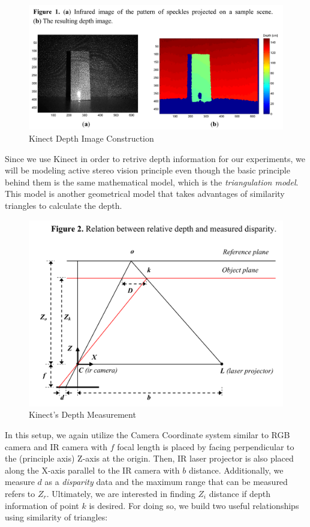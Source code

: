 \documentclass[a4paper]{report}
\numberwithin{figure}{section}
\begin{document}
\begin{figure}[H]
	\centering
  \includegraphics[width=0.7\linewidth,natwidth=640,natheight=640]
  {fig/ref_imgs/kinect_depth_img.png}
  \caption{Kinect Depth Image Construction}
	\label{fig:kinect_depth_img}
\end{figure}

Since we use Kinect in order to retrive depth information for our experiments, 
we will be modeling active stereo vision principle even though the 
basic principle behind them is the same mathematical model, which is 
the \textit{triangulation model}. This model is another geometrical model that 
takes advantages of similarity triangles to calculate the depth. 

\begin{figure}[H]
	\centering
  \includegraphics[width=0.7\linewidth,natwidth=640,natheight=640]
  {fig/ref_imgs/kinect_depth_measurement.png}
  \caption{Kinect's Depth Measurement}
	\label{fig:uncertainty_matching}
\end{figure}

In this setup, 
we again utilize the Camera Coordinate system similar to RGB camera
and IR camera with $f$ focal length is placed by facing perpendicular to 
the (principle axis) Z-axis at the origin. Then, IR laser projector is 
also placed along the X-axis parallel to the IR camera with $b$ distance. 
Additionally, we measure $d$ as a \textit{disparity} data and 
the maximum range that can be measured refers to $Z_r$. Ultimately, we are 
interested in finding $Z_i$ distance if depth information of point $k$ 
is desired. For doing so, we build two useful relationships using similarity of triangles:
\end{document}

